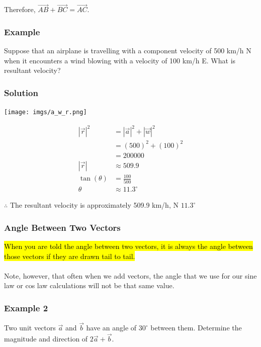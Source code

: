 \documentclass{article}
\begin{document}
Therefore, $\overrightarrow{AB}+\overrightarrow{BC}=\overrightarrow{AC}$.

\subsubsection*{Example}
Suppose that an airplane is travelling with a component velocity of 500 km/h N when it encounters a wind blowing with a velocity of 100 km/h E. What is resultant velocity?

\subsubsection*{Solution}
\begin{minipage}{0.45\textwidth}
    \centeringa
    \texttt{[image: imgs/a\_w\_r.png]}
\end{minipage}%
\begin{minipage}{0.4\textwidth}
    \begin{align*}
        |\vec{r}|^2 &= |\vec{a}|^2 + |\vec{w}|^2 \\
                    &= (500)^2 + (100)^2 \\
                    &= 200000 \\
        |\vec{r}| &\approx 509.9 \\
        \tan (\theta) &= \frac{100}{500} \\
        \theta &\approx 11.3^{\circ}
    \end{align*}
\end{minipage}
\vspace{2em}

    $\therefore$ The resultant velocity is approximately 509.9 km/h, N $11.3^{\circ}$

\subsubsection{Angle Between Two Vectors}
\hl{When you are told the angle between two vectors, it is always the angle between those vectors if they are drawn tail to tail.}
\\ \\ 
Note, however, that often when we add vectors, the angle that we use for our sine law or cos law calculations will not be that same value.
\subsubsection*{Example 2}
Two unit vectors $\vec{a}$ and $\vec{b}$ have an angle of $30^{\circ}$ between them. Determine the magnitude and direction of $2\vec{a}+\vec{b}$.
\end{document}
